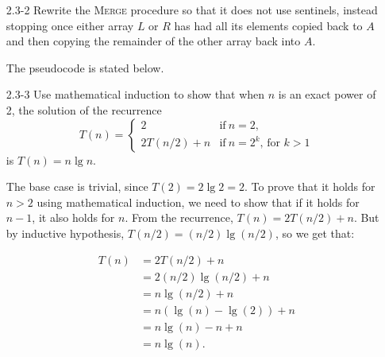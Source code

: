 \documentclass{report}
\makeatletter
\renewenvironment{framed}{%
 \def\FrameCommand##1{\hskip\@totalleftmargin
 \fboxsep=\FrameSep\fbox{##1}}%
 \MakeFramed {\advance\hsize-\width
   \@totalleftmargin\z@ \linewidth\hsize
   \@setminipage}}%
 {\par\unskip\endMakeFramed}
\makeatother
\begin{document}
\begin{enumerate}
\begin{framed}
\end{framed}

\item[2.3{-}2]{Rewrite the \textsc{Merge} procedure so that it does not use
sentinels, instead stopping once either array $L$ or $R$ has had all its
elements copied back to $A$ and then copying the remainder of the other
array back into $A$.}

\begin{framed}
The pseudocode is stated below.\\
\begin{algorithm}[H]
\SetAlgoNoEnd\DontPrintSemicolon
\BlankLine
{}
\end{algorithm}
\end{framed}

\item[2.3{-}3]{Use mathematical induction to show that when $n$ is an exact
power of 2, the solution of the recurrence
\begin{equation*}
  T(n) =
    \begin{cases}
      2 & \text{if}\ n=2 \text{,} \\
      2 T(n/2) + n & \text{if}\ n = 2^k \text{, for } k> 1
    \end{cases}
\end{equation*}
is $T(n) = n \lg n$.
}

\begin{framed}
  The base case is trivial, since $T(2) = 2 \lg 2 = 2$. To prove that it holds
  for $n > 2$ using mathematical induction, we need to show that if it holds for
  $n - 1$, it also holds for $n$. From the recurrence, $T(n) = 2T(n / 2) + n$.
  But by inductive hypothesis, $T(n / 2) = (n / 2) \lg (n / 2)$, so we get that:

  \begin{equation*}
  \begin{split}
    T(n) & = 2T(n/2) + n\\
         & = 2 (n / 2) \lg (n / 2) + n\\
         & = n \lg (n / 2) + n\\
         & = n (\lg (n) - \lg(2)) + n\\
         & = n \lg (n) - n + n\\
         & = n \lg (n).\\
  \end{split}
  \end{equation*}


\end{framed}
\end{enumerate}
\end{document}

